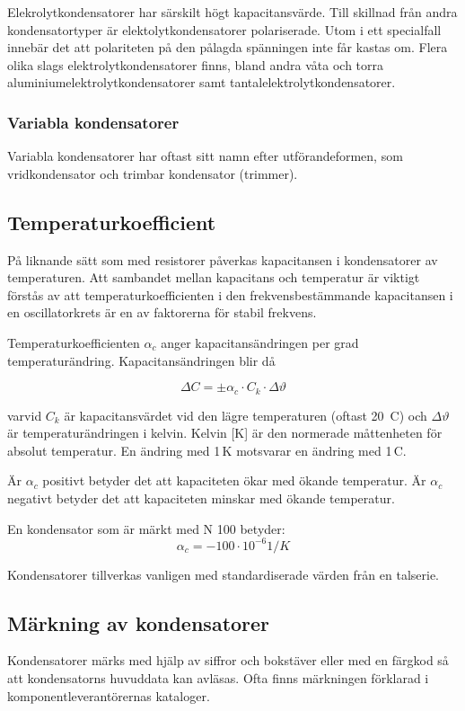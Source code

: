 Elekrolytkondensatorer har särskilt högt kapacitansvärde. Till skillnad från
andra kondensatortyper är elektolytkondensatorer polariserade. Utom i ett
specialfall innebär det att polariteten på den pålagda spänningen inte får
kastas om. Flera olika slags elektrolytkondensatorer finns, bland andra våta
och torra aluminiumelektrolytkondensatorer samt tantalelektrolytkondensatorer.

\subsubsection{Variabla kondensatorer}
Variabla kondensatorer har oftast sitt namn efter utförandeformen, som
vridkondensator och trimbar kondensator (trimmer).

\subsection{Temperaturkoefficient}

På liknande sätt som med resistorer påverkas kapacitansen i kondensatorer av
temperaturen. Att sambandet mellan kapacitans och temperatur är viktigt förstås
av att temperaturkoefficienten i den frekvensbestämmande kapacitansen i en
oscillatorkrets är en av faktorerna för stabil frekvens.

Temperaturkoefficienten \(\alpha _c\) anger kapacitansändringen per grad temperaturändring.
Kapacitansändringen blir då

\[  \Delta C = \pm \alpha _c \cdot C_k \cdot \Delta\vartheta  \]

varvid \(C_k\) är kapacitansvärdet vid den lägre temperaturen (oftast 20~\degree C) och
\(\Delta\vartheta\) är temperaturändringen i kelvin.
Kelvin [K] är den normerade måttenheten för absolut temperatur.
En ändring med 1\,K motsvarar en ändring med 1\degree\,C.

Är \(\alpha _c\) positivt betyder det att kapaciteten ökar med ökande
temperatur. Är \(\alpha _c\) negativt betyder det att kapaciteten minskar med ökande
temperatur.

En kondensator som är märkt med N 100 betyder:
\[ \alpha _c = -100 \cdot 10^{-6} 1/\unit{K}  \]


Kondensatorer tillverkas vanligen med standardiserade värden från en talserie.

\subsection{Märkning av kondensatorer}

Kondensatorer märks med hjälp av siffror och bokstäver eller med en
färgkod så att kondensatorns huvuddata kan avläsas.
Ofta finns märkningen förklarad i komponentleverantörernas kataloger.
